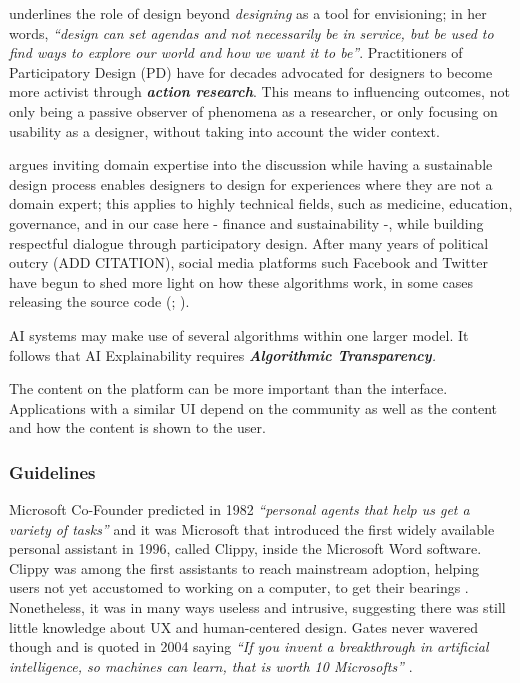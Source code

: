 \documentclass[
  letterpaper,
  DIV=11,
  numbers=noendperiod]{scrartcl}
\begin{document}
\citet{lorenzoDaisyGinsbergImagines2015} underlines the role of design
beyond \emph{designing} as a tool for envisioning; in her words,
\emph{``design can set agendas and not necessarily be in service, but be
used to find ways to explore our world and how we want it to be''}.
Practitioners of Participatory Design (PD) have for decades advocated
for designers to become more activist through \textbf{\emph{action
research}}. This means to influencing outcomes, not only being a passive
observer of phenomena as a researcher, or only focusing on usability as
a designer, without taking into account the wider context.

\citet{shenoiParticipatoryDesignFuture2018} argues inviting domain
expertise into the discussion while having a sustainable design process
enables designers to design for experiences where they are not a domain
expert; this applies to highly technical fields, such as medicine,
education, governance, and in our case here - finance and sustainability
-, while building respectful dialogue through participatory design.
After many years of political outcry (ADD CITATION), social media
platforms such Facebook and Twitter have begun to shed more light on how
these algorithms work, in some cases releasing the source code
(\citet{nickcleggHowAIInfluences2023};
\citet{twitterTwitterRecommendationAlgorithm2023}).

AI systems may make use of several algorithms within one larger model.
It follows that AI Explainability requires \emph{\textbf{Algorithmic
Transparency}.}

The content on the platform can be more important than the interface.
Applications with a similar UI depend on the community as well as the
content and how the content is shown to the user.

\subsubsection{Guidelines}\label{guidelines}

Microsoft Co-Founder predicted in 1982 \emph{``personal agents that help
us get a variety of tasks''} \citep{billgatesBillGatesNext1982} and it
was Microsoft that introduced the first widely available personal
assistant in 1996, called Clippy, inside the Microsoft Word software.
Clippy was among the first assistants to reach mainstream adoption,
helping users not yet accustomed to working on a computer, to get their
bearings \citep{tashkeunemanWeLoveHate2022}. Nonetheless, it was in many
ways useless and intrusive, suggesting there was still little knowledge
about UX and human-centered design. Gates never wavered though and is
quoted in 2004 saying \emph{``If you invent a breakthrough in artificial
intelligence, so machines can learn, that is worth 10 Microsofts''}
\citet{lohrMicrosoftDwindlingInterest2004}.
\end{document}
